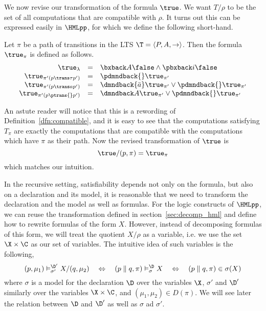 We now revise our transformation of the formula $\true$. We want $T/\rho$ to be
the set of all computations that are compatible with $\rho$. It turns out this
can be expressed easily in $\HMLpp$, for which we define the following short-hand.
\begin{definition}
    Let $\pi$ be a path of transitions in the LTS
    $\T = \langle P,A,\rightarrow \rangle$.
    Then the \HMLpp{} formula $\true_\pi$ is defined as follows.
    \[ \begin{array}{rcl}
        \true_\lambda &=& \bxback A \false \land \pbxback i \false \\
        \true_{\pi'(p\trans \tau p')} &=& \pdmndback{} \true_{\pi'} \\
        \true_{\pi'(p\trans a p')} &=& \dmndback{\bar a} \true_{\pi'}  \lor \pdmndback{} \true_{\pi'} \\
        \true_{\pi'(p\ptrans{} p')} &=& \dmndback A \true_{\pi'} \lor \pdmndback{} \true_{\pi'} \\
    \end{array} \]
\end{definition}
An astute reader will notice that this is a rewording of Definition~\ref{dfn:compatible},
and it is easy to see that the computations satisfying $T_\pi$ are exactly the computations
that are compatible with the computations which have $\pi$ as their path. 
Now the revised transformation of $\true$ is
\begin{equation}
\true/(p,\pi) = \true_\pi
\end{equation}
which matches our intuition.

\hspace{1cm}

In the recursive setting, satisfiability depends not only on the formula, 
but also on a declaration
and its model, it is reasonable that we need to transform the declaration and
the model as well as formulas.
For the logic constructs of $\HMLpp$, we can reuse the transformation defined
in section~\ref{sec:decomp_hml} and define how to rewrite formulas of the form $X$. 
However, instead
of decomposing formulas of this form, we will treat the quotient $X/\rho$
as a variable, i.e. we use the set $\X\times\C$ as our set of variables. 
The intuitive idea of such variables is the following,
\[
(p,\mu_1) \vDash^{\D'}_{\sigma'} X/(q,\mu_2)
\quad \Leftrightarrow \quad
(p\parallel q, \pi) \vDash^\D_\sigma X
\quad \Leftrightarrow \quad
(p\parallel q, \pi) \in \sigma(X)
\]
where $\sigma$ is a model for the declaration $\D$ over the variables $\X$, 
$\sigma'$ and $\D'$ similarly over the variables $\X\times\C$,
and $(\mu_1,\mu_2)\in D(\pi)$. 
We will see later the relation between $\D$ and $\D'$
as well as $\sigma$ ad $\sigma'$.

